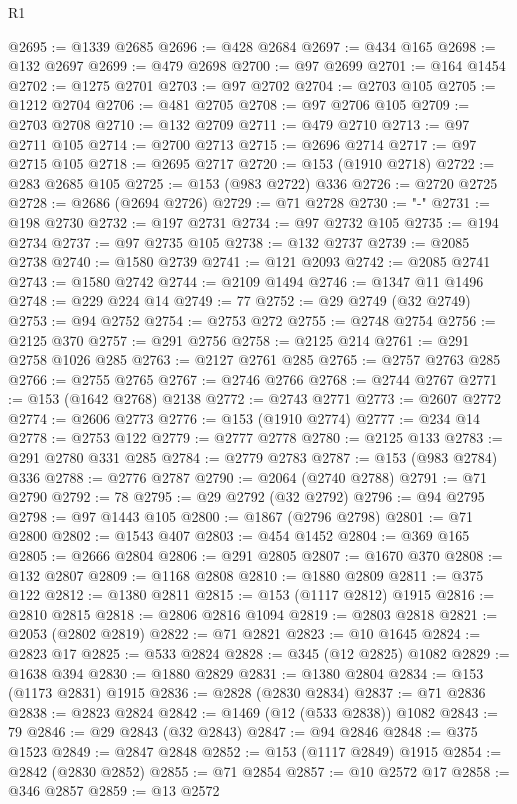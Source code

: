 \begin{lexlean}{R1}
\begin{coremodule}
{{{{{{{{{{{{{{{{{{{{{{{{{{{{{{{{{{{{{{{{{{{{{{{{{{{{{{{{{{{{{{{{{{{{{{{{{{{{{{{{{{{{{{{{{{{{{{{{{{{{{{{{{{{{{{{{{{{{{{{{{{{{{{{{{{{{{{{{{{{{{{{{{{{{{{{{{{{{{{{{{{{{{{{{{{{{{{{{{{{{{{{{{{@2695 := @1339 @2685
@2696 := @428 @2684
@2697 := @434 @165
@2698 := @132 @2697
@2699 := @479 @2698
@2700 := @97 @2699
@2701 := @164 @1454
@2702 := @1275 @2701
@2703 := @97 @2702
@2704 := @2703 @105
@2705 := @1212 @2704
@2706 := @481 @2705
@2708 := @97 @2706 @105
@2709 := @2703 @2708
@2710 := @132 @2709
@2711 := @479 @2710
@2713 := @97 @2711 @105
@2714 := @2700 @2713
@2715 := @2696 @2714
@2717 := @97 @2715 @105
@2718 := @2695 @2717
@2720 := @153 (@1910 @2718)
@2722 := @283 @2685 @105
@2725 := @153 (@983 @2722) @336
@2726 := @2720 @2725
@2728 := @2686 (@2694 @2726)
@2729 := @71 @2728
@2730 := "-"
@2731 := @198 @2730
@2732 := @197 @2731
@2734 := @97 @2732 @105
@2735 := @194 @2734
@2737 := @97 @2735 @105
@2738 := @132 @2737
@2739 := @2085 @2738
@2740 := @1580 @2739
@2741 := @121 @2093
@2742 := @2085 @2741
@2743 := @1580 @2742
@2744 := @2109 @1494
@2746 := @1347 @11 @1496
@2748 := @229 @224 @14
@2749 := 77
@2752 := @29 @2749 (@32 @2749)
@2753 := @94 @2752
@2754 := @2753 @272
@2755 := @2748 @2754
@2756 := @2125 @370
@2757 := @291 @2756
@2758 := @2125 @214
@2761 := @291 @2758 @1026 @285
@2763 := @2127 @2761 @285
@2765 := @2757 @2763 @285
@2766 := @2755 @2765
@2767 := @2746 @2766
@2768 := @2744 @2767
@2771 := @153 (@1642 @2768) @2138
@2772 := @2743 @2771
@2773 := @2607 @2772
@2774 := @2606 @2773
@2776 := @153 (@1910 @2774)
@2777 := @234 @14
@2778 := @2753 @122
@2779 := @2777 @2778
@2780 := @2125 @133
@2783 := @291 @2780 @331 @285
@2784 := @2779 @2783
@2787 := @153 (@983 @2784) @336
@2788 := @2776 @2787
@2790 := @2064 (@2740 @2788)
@2791 := @71 @2790
@2792 := 78
@2795 := @29 @2792 (@32 @2792)
@2796 := @94 @2795
@2798 := @97 @1443 @105
@2800 := @1867 (@2796 @2798)
@2801 := @71 @2800
@2802 := @1543 @407
@2803 := @454 @1452
@2804 := @369 @165
@2805 := @2666 @2804
@2806 := @291 @2805
@2807 := @1670 @370
@2808 := @132 @2807
@2809 := @1168 @2808
@2810 := @1880 @2809
@2811 := @375 @122
@2812 := @1380 @2811
@2815 := @153 (@1117 @2812) @1915
@2816 := @2810 @2815
@2818 := @2806 @2816 @1094
@2819 := @2803 @2818
@2821 := @2053 (@2802 @2819)
@2822 := @71 @2821
@2823 := @10 @1645
@2824 := @2823 @17
@2825 := @533 @2824
@2828 := @345 (@12 @2825) @1082
@2829 := @1638 @394
@2830 := @1880 @2829
@2831 := @1380 @2804
@2834 := @153 (@1173 @2831) @1915
@2836 := @2828 (@2830 @2834)
@2837 := @71 @2836
@2838 := @2823 @2824
@2842 := @1469 (@12 (@533 @2838)) @1082
@2843 := 79
@2846 := @29 @2843 (@32 @2843)
@2847 := @94 @2846
@2848 := @375 @1523
@2849 := @2847 @2848
@2852 := @153 (@1117 @2849) @1915
@2854 := @2842 (@2830 @2852)
@2855 := @71 @2854
@2857 := @10 @2572 @17
@2858 := @346 @2857
@2859 := @13 @2572
}}}}}}}}}}}}}}}}}}}}}}}}}}}}}}}}}}}}}}}}}}}}}}}}}}}}}}}}}}}}}}}}}}}}}}}}}}}}}}}}}}}}}}}}}}}}}}}}}}}}}}}}}}}}}}}}}}}}}}}}}}}}}}}}}}}}}}}}}}}}}}}}}}}}}}}}}}}}}}}}}}}}}}}}}}}}}}}}}}}}}}}}}}
\end{coremodule}
\end{lexlean}
